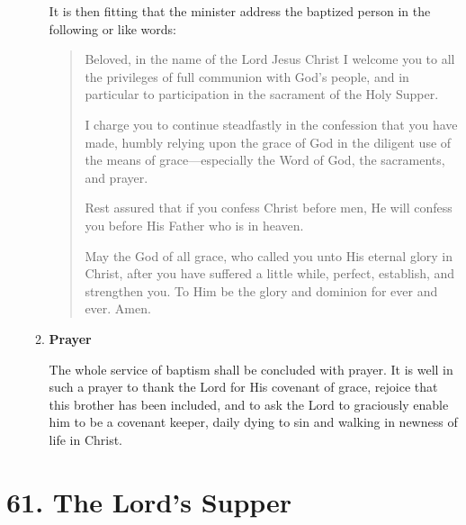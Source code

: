 \documentclass[
]{book}
\begin{document}
\begin{enumerate}
\begin{enumerate}
    It is then fitting that the minister address the baptized person in the following or like words:

    \begin{quote}
    Beloved, in the name of the Lord Jesus Christ I welcome you to all the privileges of full communion with God's people, and in particular to participation in the sacrament of the Holy Supper.

    I charge you to continue steadfastly in the confession that you have made, humbly relying upon the grace of God in the diligent use of the means of grace---especially the Word of God, the sacraments, and prayer.

    Rest assured that if you confess Christ before men, He will confess you before His Father who is in heaven.

    May the God of all grace, who called you unto His eternal glory in Christ, after you have suffered a little while, perfect, establish, and strengthen you. To Him be the glory and dominion for ever and ever. Amen.
    \end{quote}
  \item
    \textbf{Prayer}

    The whole service of baptism shall be concluded with prayer. It is well in such a prayer to thank the Lord for His covenant of grace, rejoice that this brother has been included, and to ask the Lord to graciously enable him to be a covenant keeper, daily dying to sin and walking in newness of life in Christ.
  \end{enumerate}
\end{enumerate}

\hypertarget{the-lords-supper}{%
\section*{61. The Lord's Supper}\label{the-lords-supper}}

\protect\hypertarget{chapter-slug-61-the-lords-supper}{\href{}{}}
\end{document}
